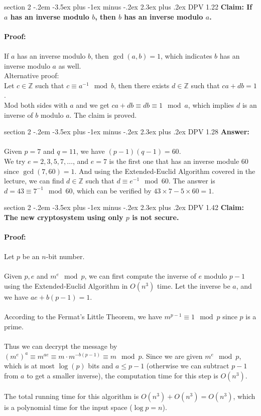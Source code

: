 \documentclass{article}
\makeatletter
\newenvironment{problem}{\@startsection
       {section}
       {2}
       {-.2em}
       {-3.5ex plus -1ex minus -.2ex}
       {2.3ex plus .2ex}
       {\pagebreak[3]%
       \large\bf\noindent{Problem }
       }
       }
\makeatother
\begin{document}
\begin{problem} {DPV 1.22}
	\textbf{Claim: If $a$ has an inverse modulo $b$, then $b$ has an inverse modulo $a$.}\\\\
	\textbf{Proof:}\\\\
	If $a$ has an inverse modulo $b$, then $\gcd(a, b) = 1$, which indicates $b$ has an inverse modulo $a$ as well.\\
	Alternative proof: \\
	Let $c \in \mathbb{Z}$ such that $c \equiv a^{-1} \mod b$, then there exists $d \in \mathbb{Z}$ such that $ca + db = 1$.\\
	Mod both sides with $a$ and we get $ca + db \equiv db \equiv 1 \mod a$, which implies $d$ is an inverse of $b$ modulo $a$. The claim is proved.
\end{problem}

\begin{problem} {DPV 1.28}
	\textbf{Answer:}\\\\
	Given $p = 7$ and $q = 11$, we have $(p-1)(q-1) = 60$.\\
	We try $e = 2, 3, 5, 7, \dots$, and $e=7$ is the first one that has an inverse module 60 since $\gcd(7, 60) = 1$. And using the Extended-Euclid Algorithm covered in the lecture, we can find $d \in \mathbb{Z}$ such that $d \equiv e^{-1} \mod 60$. The answer is $d = 43 \equiv 7^{-1} \mod 60$, which can be verified by $43 \times 7 - 5 \times 60 = 1$.
\end{problem}

\begin{problem} {DPV 1.42}
	\textbf{Claim: The new cryptosystem using only $p$ is not secure.}\\\\
	\textbf{Proof:}\\\\
	Let $p$ be an $n$-bit number.\\\\
	Given $p, e$ and $m^e \mod p$, we can first compute the inverse of $e$ modulo $p-1$ using the Extended-Euclid Algorithm in $O(n^3)$ time. Let the inverse be $a$, and we have $ae + b (p-1) = 1$. \\\\
	According to the Fermat's Little Theorem, we have $m^{p-1} \equiv 1 \mod p$ since $p$ is a prime.\\\\
	Thus we can decrypt the message by $(m^e)^a \equiv m^{ae} \equiv m \cdot m^{-b(p-1)} \equiv m \mod p$. Since we are given $m^e \mod p$, which is at most $\log(p)$ bits and $a \leq p-1$ (otherwise we can subtract $p-1$ from $a$ to get a smaller inverse), the computation time for this step is $O(n^3)$.\\\\
	The total running time for this algorithm is $O(n^3) + O(n^3) = O(n^3)$, which is a polynomial time for the input space ($\log p = n$).
\end{problem}
\end{document}
